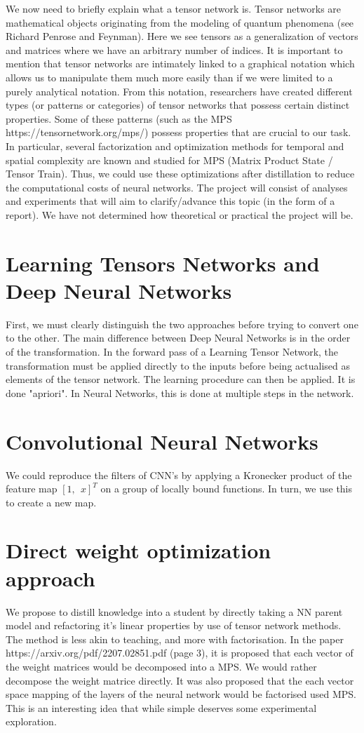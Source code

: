 \documentclass[11pt]{article}
\begin{document}
We now need to briefly explain what a tensor network is. Tensor networks are mathematical objects originating from the modeling of quantum phenomena (see Richard Penrose and Feynman). Here we see tensors as a generalization of vectors and matrices where we have an arbitrary number of indices. It is important to mention that tensor networks are intimately linked to a graphical notation which allows us to manipulate them much more easily than if we were limited to a purely analytical notation. From this notation, researchers have created different types (or patterns or categories) of tensor networks that possess certain distinct properties. Some of these patterns (such as the MPS https://tensornetwork.org/mps/) possess properties that are crucial to our task. In particular, several factorization and optimization methods for temporal and spatial complexity are known and studied for MPS (Matrix Product State / Tensor Train). Thus, we could use these optimizations after distillation to reduce the computational costs of neural networks. The project will consist of analyses and experiments that will aim to clarify/advance this topic (in the form of a report). We have not determined how theoretical or practical the project will be.

\section{Learning Tensors Networks and Deep Neural Networks}
First, we must clearly distinguish the two approaches before trying to convert one to the other. The main difference between Deep Neural Networks is in the order of the transformation. In the forward pass of a Learning Tensor Network, the transformation must be applied directly to the inputs before being actualised as elements of the tensor network. The learning procedure can then be applied. It is done "apriori". In Neural Networks, this is done at multiple steps in the network. 

\section{Convolutional Neural Networks}
We could reproduce the filters of CNN's by applying a Kronecker product of the feature map $[ 1, \ \ x ]^T $ on a group of locally bound functions. In turn, we use this to create a new map.

\section{Direct weight optimization approach}
We propose to distill knowledge into a student by directly taking a NN parent model and refactoring it's linear properties by use of tensor network methods. The method is less akin to teaching, and more with factorisation. In the paper https://arxiv.org/pdf/2207.02851.pdf (page 3), it is proposed that each vector of the weight matrices would be decomposed into a MPS. We would rather decompose the weight matrice directly. It was also proposed that the each vector space mapping of the layers of the neural network would be factorised used MPS. This is an interesting idea that while simple deserves some experimental exploration.
\end{document}
